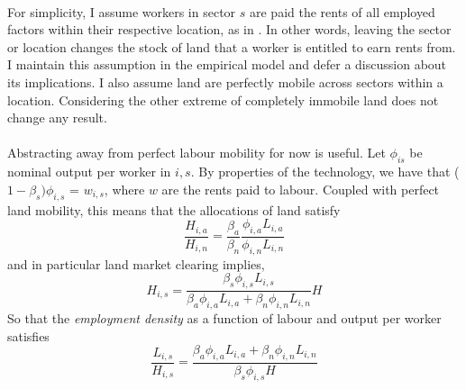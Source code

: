 \documentclass[]{article}
\theoremstyle{plain}
\begin{document}
\paragraph*{}
For simplicity, I assume workers in sector $s$ are paid the rents of all employed factors within their respective location, as in \cite{redding2016}. In other words, leaving the sector or location changes the stock of land that a worker is entitled to earn rents from. I maintain this assumption in the empirical model and defer a discussion about its implications. I also assume land are perfectly mobile across sectors within a location. Considering the other extreme of completely immobile land does not change any result.
\paragraph*{} 
Abstracting away from perfect labour mobility for now is useful. Let $\phi_{is}$ be nominal output per worker in $i,s$. By properties of the technology, we have that ($1-\beta_{s})\phi_{i,s}$ = $w_{i,s}$, where $w$ are the rents paid to labour. Coupled with perfect land mobility, this means that the allocations of land satisfy
\begin{equation*}
	\frac{H_{i,a}}{H_{i,n}} = \frac{\beta_{a}}{\beta_{n}}\frac{\phi_{i,a}L_{i, a}}{\phi_{i,n}L_{i, n}}
\end{equation*}
and in particular land market clearing implies,
\begin{equation*}
	H_{i,s} = \frac{\beta_{s}\phi_{i,s}L_{i, s}}{\beta_{a}\phi_{i,a}L_{i, a} + \beta_{n}\phi_{i,n}L_{i, n}}H
\end{equation*}
So that the \textit{employment density} as a function of labour and output per worker satisfies
\begin{equation}
	\frac{L_{i, s}}{H_{i, s}} = \frac{\beta_{a}\phi_{i,a}L_{i, a} + \beta_{n}\phi_{i,n}L_{i, n}}{\beta_{s}\phi_{i,s}H}
\end{equation}
\end{document}
